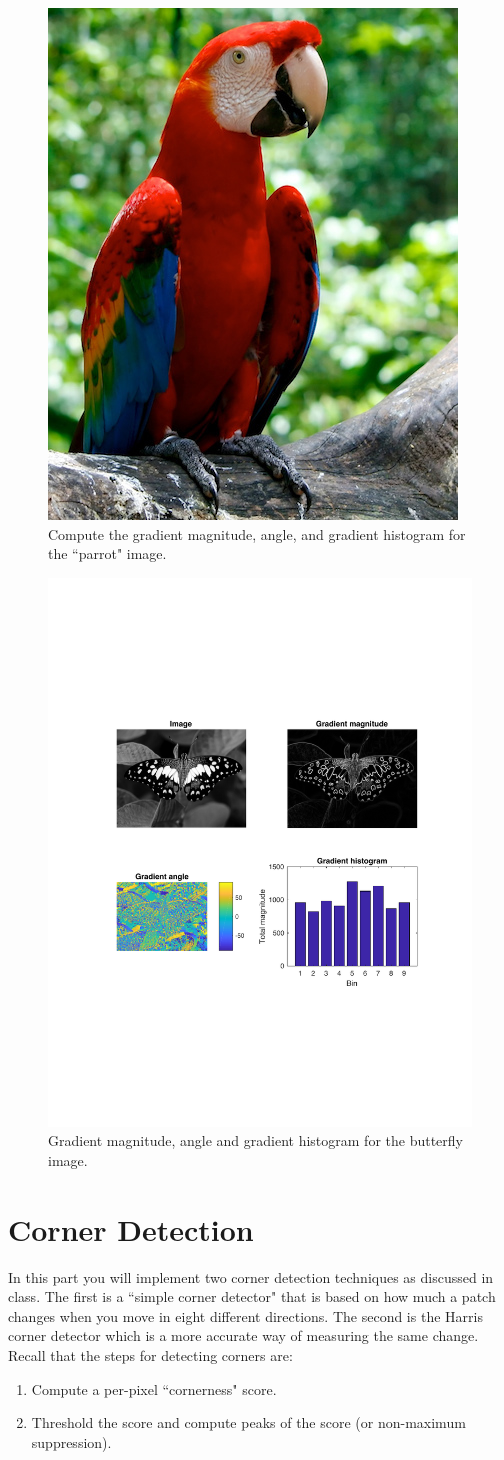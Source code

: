 \documentclass[10pt,letterpaper]{article}
\begin{document}
\begin{figure}[h]
\centering
\includegraphics[width=0.2\linewidth]{figs/parrot.jpg}
\caption{\label{fig:parrot} Compute the gradient magnitude, angle, and gradient histogram for the ``parrot" image.}
\end{figure}

\begin{figure}[h]
\centering
\includegraphics[width=0.8\linewidth]{figs/butterfly-result.pdf}
\vspace{-0.2in}
\caption{\label{fig:butterfly} Gradient magnitude, angle and gradient histogram for the
  butterfly image.}
\end{figure}


  

\newpage
\section{Corner Detection}
In this part you will implement two corner detection techniques as discussed in class. The first is a ``simple corner detector" that is based on how much a patch changes when you move in eight different directions. The second is the Harris corner detector which is a more accurate way of measuring the same change. Recall that the steps for detecting corners are:
\begin{enumerate}
\item Compute a per-pixel ``cornerness" score.
\item Threshold the score and compute peaks of the score (or non-maximum suppression).
\end{enumerate}
\end{document}

